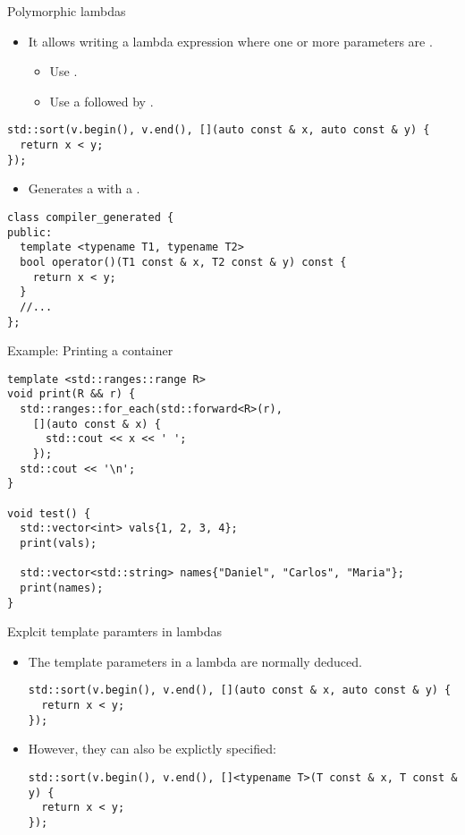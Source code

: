 \begin{frame}[t,fragile]{Polymorphic lambdas}
\begin{itemize}
  \item It allows writing a lambda expression where one or more parameters are .
    \begin{itemize}
      \item Use .
      \item Use a  followed by .
    \end{itemize}
\end{itemize}
\pause
\begin{lstlisting}
std::sort(v.begin(), v.end(), [](auto const & x, auto const & y) {
  return x < y;
});
\end{lstlisting}

\begin{itemize}
  \item Generates a  with a  .
\end{itemize}
\begin{lstlisting}
class compiler_generated {
public:
  template <typename T1, typename T2>
  bool operator()(T1 const & x, T2 const & y) const {
    return x < y;
  }
  //...
};
\end{lstlisting}
\end{frame}


\begin{frame}[t,fragile]{Example: Printing a container}
\begin{lstlisting}
template <std::ranges::range R>
void print(R && r) {
  std::ranges::for_each(std::forward<R>(r),
    [](auto const & x) {
      std::cout << x << ' ';
    });
  std::cout << '\n';
}

void test() {
  std::vector<int> vals{1, 2, 3, 4};
  print(vals);

  std::vector<std::string> names{"Daniel", "Carlos", "Maria"};
  print(names);
}
\end{lstlisting}
\end{frame}
\begin{frame}[t,fragile]{Explcit template paramters in lambdas}
\begin{itemize}
  \item The template parameters in a lambda are normally deduced.
\begin{lstlisting}
std::sort(v.begin(), v.end(), [](auto const & x, auto const & y) {
  return x < y;
});
\end{lstlisting}

  \item However, they can also be explictly specified:
\begin{lstlisting}
std::sort(v.begin(), v.end(), []<typename T>(T const & x, T const & y) {
  return x < y;
});
\end{lstlisting}
\end{itemize}
\end{frame}

